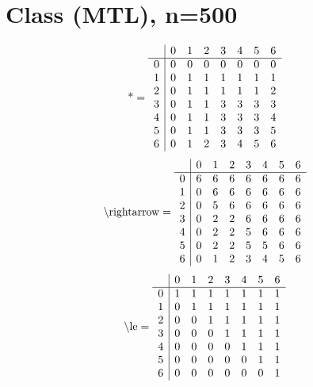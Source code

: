 \documentclass[11pt]{article}
\begin{document}
\section{Class (MTL), n=500}
\[\text{*} = 
\begin{array}{r | r r r r r r r}
 & 0 & 1 & 2 & 3 & 4 & 5 & 6 \\ \hline
0 & 0 & 0 & 0 & 0 & 0 & 0 & 0 \\
1 & 0 & 1 & 1 & 1 & 1 & 1 & 1 \\
2 & 0 & 1 & 1 & 1 & 1 & 1 & 2 \\
3 & 0 & 1 & 1 & 3 & 3 & 3 & 3 \\
4 & 0 & 1 & 1 & 3 & 3 & 3 & 4 \\
5 & 0 & 1 & 1 & 3 & 3 & 3 & 5 \\
6 & 0 & 1 & 2 & 3 & 4 & 5 & 6 \\
\end{array}
\]
\[\text{\textbackslash rightarrow} = 
\begin{array}{r | r r r r r r r}
 & 0 & 1 & 2 & 3 & 4 & 5 & 6 \\ \hline
0 & 6 & 6 & 6 & 6 & 6 & 6 & 6 \\
1 & 0 & 6 & 6 & 6 & 6 & 6 & 6 \\
2 & 0 & 5 & 6 & 6 & 6 & 6 & 6 \\
3 & 0 & 2 & 2 & 6 & 6 & 6 & 6 \\
4 & 0 & 2 & 2 & 5 & 6 & 6 & 6 \\
5 & 0 & 2 & 2 & 5 & 5 & 6 & 6 \\
6 & 0 & 1 & 2 & 3 & 4 & 5 & 6 \\
\end{array}
\]
\[\text{\textbackslash le} = 
\begin{array}{r | r r r r r r r}
 & 0 & 1 & 2 & 3 & 4 & 5 & 6 \\ \hline
0 & 1 & 1 & 1 & 1 & 1 & 1 & 1 \\
1 & 0 & 1 & 1 & 1 & 1 & 1 & 1 \\
2 & 0 & 0 & 1 & 1 & 1 & 1 & 1 \\
3 & 0 & 0 & 0 & 1 & 1 & 1 & 1 \\
4 & 0 & 0 & 0 & 0 & 1 & 1 & 1 \\
5 & 0 & 0 & 0 & 0 & 0 & 1 & 1 \\
6 & 0 & 0 & 0 & 0 & 0 & 0 & 1 \\
\end{array}
\]
\end{document}
